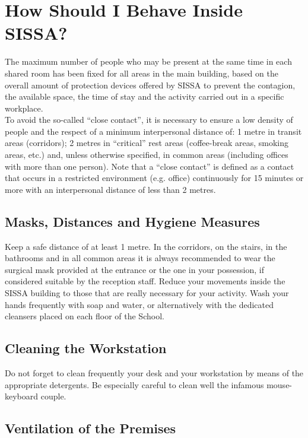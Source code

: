 \documentclass{sissavademecum}
\begin{document}
\section{How Should I Behave Inside SISSA?}

The maximum number of people who may be present at the same time in each shared room has been fixed for all areas in the main building, based on the overall amount of protection devices offered by SISSA to prevent the contagion, the available space, the time of stay and the activity carried out in a specific workplace. \\
To avoid the so-called ``close contact'', it is necessary to ensure a low density of people and the respect of a minimum interpersonal distance of: 1 metre in transit areas (corridors); 2 metres in ``critical'' rest areas (coffee-break areas, smoking areas, etc.) and, unless otherwise specified, in common areas (including offices with more than one person). Note that a ``close contact'' is defined as a contact that occurs in a restricted environment (e.g. office) continuously for 15 minutes or more with an interpersonal distance of less than 2 metres.


\subsection{Masks, Distances and Hygiene Measures}

Keep a safe distance of at least 1 metre. In the corridors, on the stairs, in the bathrooms and in all common areas it is always recommended to wear the surgical mask provided at the entrance or the one in your possession, if considered suitable by the reception staff. Reduce your movements inside the SISSA building to those that are really necessary for your activity. Wash your hands frequently with soap and water, or alternatively with the dedicated cleansers placed on each floor of the School.


\subsection{Cleaning the Workstation}

Do not forget to clean frequently your desk and your workstation by means of the appropriate detergents. Be especially careful to clean well the infamous mouse-keyboard couple.


\subsection{Ventilation of the Premises}
\end{document}
